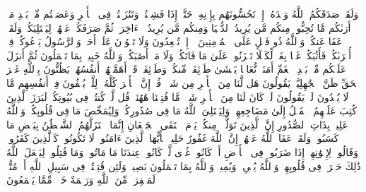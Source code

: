 وَلَقَدۡ صَدَقَكُمُ ٱللَّهُ وَعۡدَهُۥۤ إِذۡ تَحُسُّونَهُم بِإِذۡنِهِۦۖ حَتَّىٰۤ إِذَا فَشِلۡتُمۡ وَتَنَٰزَعۡتُمۡ فِی ٱلۡأَمۡرِ وَعَصَیۡتُم مِّنۢ بَعۡدِ مَاۤ أَرَىٰكُم مَّا تُحِبُّونَۚ مِنكُم مَّن یُرِیدُ ٱلدُّنۡیَا وَمِنكُم مَّن یُرِیدُ ٱلۡءَاخِرَةَۚ ثُمَّ صَرَفَكُمۡ عَنۡهُمۡ لِیَبۡتَلِیَكُمۡۖ وَلَقَدۡ عَفَا عَنكُمۡۗ وَٱللَّهُ ذُو فَضۡلٍ عَلَى ٱلۡمُؤۡمِنِینَ%
\stopbuffer
\startbuffer[\q:3:153]
۞ إِذۡ تُصۡعِدُونَ وَلَا تَلۡوُۥنَ عَلَىٰۤ أَحَدࣲ وَٱلرَّسُولُ یَدۡعُوكُمۡ فِیۤ أُخۡرَىٰكُمۡ فَأَثَٰبَكُمۡ غَمَّۢا بِغَمࣲّ لِّكَیۡلَا تَحۡزَنُوا۟ عَلَىٰ مَا فَاتَكُمۡ وَلَا مَاۤ أَصَٰبَكُمۡۗ وَٱللَّهُ خَبِیرُۢ بِمَا تَعۡمَلُونَ%
\stopbuffer
\startbuffer[\q:3:154]
ثُمَّ أَنزَلَ عَلَیۡكُم مِّنۢ بَعۡدِ ٱلۡغَمِّ أَمَنَةࣰ نُّعَاسࣰا یَغۡشَىٰ طَاۤئِفَةࣰ مِّنكُمۡۖ وَطَاۤئِفَةࣱ قَدۡ أَهَمَّتۡهُمۡ أَنفُسُهُمۡ یَظُنُّونَ بِٱللَّهِ غَیۡرَ ٱلۡحَقِّ ظَنَّ ٱلۡجَٰهِلِیَّةِۖ یَقُولُونَ هَل لَّنَا مِنَ ٱلۡأَمۡرِ مِن شَیۡءࣲۗ قُلۡ إِنَّ ٱلۡأَمۡرَ كُلَّهُۥ لِلَّهِۗ یُخۡفُونَ فِیۤ أَنفُسِهِم مَّا لَا یُبۡدُونَ لَكَۖ یَقُولُونَ لَوۡ كَانَ لَنَا مِنَ ٱلۡأَمۡرِ شَیۡءࣱ مَّا قُتِلۡنَا هَٰهُنَاۗ قُل لَّوۡ كُنتُمۡ فِی بُیُوتِكُمۡ لَبَرَزَ ٱلَّذِینَ كُتِبَ عَلَیۡهِمُ ٱلۡقَتۡلُ إِلَىٰ مَضَاجِعِهِمۡۖ وَلِیَبۡتَلِیَ ٱللَّهُ مَا فِی صُدُورِكُمۡ وَلِیُمَحِّصَ مَا فِی قُلُوبِكُمۡۚ وَٱللَّهُ عَلِیمُۢ بِذَاتِ ٱلصُّدُورِ%
\stopbuffer
\startbuffer[\q:3:155]
إِنَّ ٱلَّذِینَ تَوَلَّوۡا۟ مِنكُمۡ یَوۡمَ ٱلۡتَقَى ٱلۡجَمۡعَانِ إِنَّمَا ٱسۡتَزَلَّهُمُ ٱلشَّیۡطَٰنُ بِبَعۡضِ مَا كَسَبُوا۟ۖ وَلَقَدۡ عَفَا ٱللَّهُ عَنۡهُمۡۗ إِنَّ ٱللَّهَ غَفُورٌ حَلِیمࣱ%
\stopbuffer
\startbuffer[\q:3:156]
یَٰۤأَیُّهَا ٱلَّذِینَ ءَامَنُوا۟ لَا تَكُونُوا۟ كَٱلَّذِینَ كَفَرُوا۟ وَقَالُوا۟ لِإِخۡوَٰنِهِمۡ إِذَا ضَرَبُوا۟ فِی ٱلۡأَرۡضِ أَوۡ كَانُوا۟ غُزࣰّى لَّوۡ كَانُوا۟ عِندَنَا مَا مَاتُوا۟ وَمَا قُتِلُوا۟ لِیَجۡعَلَ ٱللَّهُ ذَٰلِكَ حَسۡرَةࣰ فِی قُلُوبِهِمۡۗ وَٱللَّهُ یُحۡیِۦ وَیُمِیتُۗ وَٱللَّهُ بِمَا تَعۡمَلُونَ بَصِیرࣱ%
\stopbuffer
\startbuffer[\q:3:157]
وَلَئِن قُتِلۡتُمۡ فِی سَبِیلِ ٱللَّهِ أَوۡ مُتُّمۡ لَمَغۡفِرَةࣱ مِّنَ ٱللَّهِ وَرَحۡمَةٌ خَیۡرࣱ مِّمَّا یَجۡمَعُونَ%
\stopbuffer
